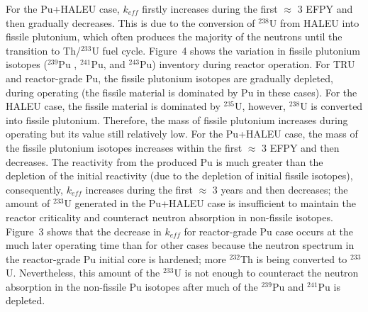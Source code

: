 \documentclass[answers,11pt]{exam}
\begin{document}
\begin{questions}
\begin{solution}
                 For the Pu+HALEU case, $k_{eff}$ firstly increases during the 
                 first $\approx$ $3$ EFPY and then gradually decreases. This 
                 is due to the conversion of $^{238}$U from HALEU into fissile 
                 plutonium, which often produces the majority of the neutrons 
                 until the transition to Th/$^{233}$U fuel cycle. Figure~4 
                 shows the variation in fissile plutonium isotopes ($^{239}$Pu 
                 , $^{241}$Pu, and $^{243}$Pu) inventory during reactor 
                 operation. For TRU and reactor-grade Pu, the fissile 
                 plutonium isotopes are gradually depleted, during operating 
                 (the fissile material is dominated by Pu in these cases). For 
                 the HALEU case, the fissile material is dominated by 
                 $^{235}$U, 
                 however, $^{238}$U is converted into fissile plutonium. 
                 Therefore, the mass of fissile plutonium increases during 
                 operating but its value still relatively low. For the 
                 Pu+HALEU case, the mass of the fissile plutonium isotopes 
                 increases 
                 within the first $\approx$ $3$ EFPY and then decreases. The 
                 reactivity from the produced Pu is much greater than the 
                 depletion of the initial reactivity (due to the depletion of 
                 initial fissile isotopes), consequently, $k_{eff}$ increases 
                 during the first $\approx$ $3$ years and then decreases; the 
                 amount of $^{233}$U generated in the Pu+HALEU case is 
                 insufficient to maintain the reactor criticality and 
                 counteract neutron absorption in non-fissile isotopes.\\
                 
                 Figure~3 shows that the decrease in $k_{eff}$ for reactor-grade Pu case occurs at the much later operating time than for other cases because the neutron spectrum in the reactor-grade Pu initial core is hardened; more $^{232}$Th is being converted to $^{233}$U. Nevertheless, this amount of the $^{233}$U is not enough to counteract the neutron absorption in the non-fissile Pu isotopes after much of the $^{239}$Pu and $^{241}$Pu is depleted.
                 
        \end{solution}


\end{questions}
\end{document}
